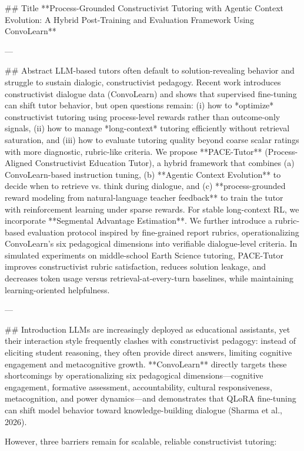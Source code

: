 ## Title  
**Process-Grounded Constructivist Tutoring with Agentic Context Evolution: A Hybrid Post-Training and Evaluation Framework Using ConvoLearn**

---

## Abstract  
LLM-based tutors often default to solution-revealing behavior and struggle to sustain dialogic, constructivist pedagogy. Recent work introduces constructivist dialogue data (ConvoLearn) and shows that supervised fine-tuning can shift tutor behavior, but open questions remain: (i) how to *optimize* constructivist tutoring using process-level rewards rather than outcome-only signals, (ii) how to manage *long-context* tutoring efficiently without retrieval saturation, and (iii) how to evaluate tutoring quality beyond coarse scalar ratings with more diagnostic, rubric-like criteria. We propose **PACE-Tutor** (Process-Aligned Constructivist Education Tutor), a hybrid framework that combines (a) ConvoLearn-based instruction tuning, (b) **Agentic Context Evolution** to decide when to retrieve vs. think during dialogue, and (c) **process-grounded reward modeling from natural-language teacher feedback** to train the tutor with reinforcement learning under sparse rewards. For stable long-context RL, we incorporate **Segmental Advantage Estimation**. We further introduce a rubric-based evaluation protocol inspired by fine-grained report rubrics, operationalizing ConvoLearn’s six pedagogical dimensions into verifiable dialogue-level criteria. In simulated experiments on middle-school Earth Science tutoring, PACE-Tutor improves constructivist rubric satisfaction, reduces solution leakage, and decreases token usage versus retrieval-at-every-turn baselines, while maintaining learning-oriented helpfulness.  

---

## Introduction  
LLMs are increasingly deployed as educational assistants, yet their interaction style frequently clashes with constructivist pedagogy: instead of eliciting student reasoning, they often provide direct answers, limiting cognitive engagement and metacognitive growth. **ConvoLearn** directly targets these shortcomings by operationalizing six pedagogical dimensions—cognitive engagement, formative assessment, accountability, cultural responsiveness, metacognition, and power dynamics—and demonstrates that QLoRA fine-tuning can shift model behavior toward knowledge-building dialogue (Sharma et al., 2026).  

However, three barriers remain for scalable, reliable constructivist tutoring:


